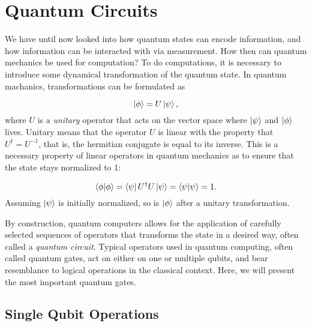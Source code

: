 \section{Quantum Circuits}\label{sec:QuantumCircuits}
We have until now looked into how quantum states can encode information, and how information can be interacted with via measurement. How then can quantum mechanics be used for computation? To do computations, it is necessary to introduce some dynamical transformation of the quantum state. In quantum machanics, transformations can be formulated as 

\begin{equation}\label{eq:UnitaryEvolution}
 \ket{\phi} = U\ket{\psi},
\end{equation}
where $U$ is a \emph{unitary} operator that acts on the vector space where $\ket{\psi}$ and $\ket{\phi}$ lives. Unitary means that the operator $U$ is linear with the property that $U^{\dagger} = U^{-1}$, that is, the hermitian conjugate is equal to its inverse. This is a necessary property of linear operators in quantum mechanics as to ensure that the state stays normalized to 1:

\begin{equation}\label{eq:UnitaryEvolution}
 \braket{\phi}{\phi} = \bra{\psi}U^{\dagger}U\ket{\psi} = \bra{\psi}\ket{\psi} =1.
\end{equation}
Assuming $\ket{\psi}$ is initially normalized, so is $\ket{\phi}$ after a unitary transformation.

By construction, quantum computers allows for the application of carefully selected sequences of operators that transforms the state in a desired way, often called a \emph{quantum circuit}. Typical operators used in quantum computing, often called quantum gates, act on either on one or multiple qubits, and bear resemblance to logical operations in the classical context. Here, we will present the most important quantum gates.

\subsection{Single Qubit Operations}\label{sec:ControlledOperations}



